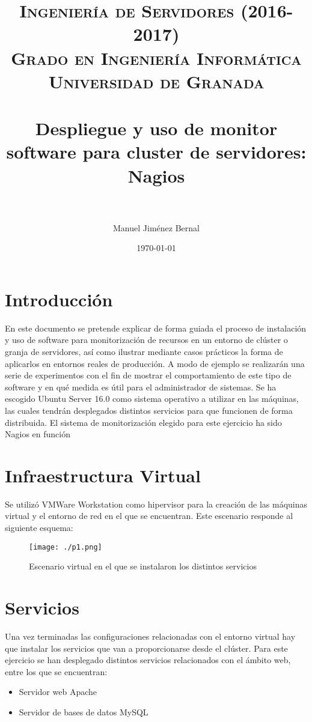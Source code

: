 \documentclass[paper=a4, fontsize=12pt]{scrartcl} %
\title{	
\normalfont \normalsize 
\textsc{{ Ingeniería de Servidores (2016-2017)} \\ Grado en Ingeniería Informática \\ Universidad de Granada} \\ [25pt] %
\horrule{0.5pt} \\[0.4cm] %
\huge Despliegue y uso de monitor software para cluster de servidores: Nagios \\ %
\horrule{2pt} \\[0.5cm] %
}
\author{Manuel Jim\'enez Bernal} %
\date{\normalsize\today} %
\begin{document}
\maketitle %
\newpage
\tableofcontents %

\listoffigures
\newpage


\section{Introducción}
En este documento se pretende explicar de forma guiada el proceso de instalación y uso de software para monitorización de recursos en un entorno de clúster o granja de servidores, así como ilustrar mediante casos prácticos la forma de aplicarlos  en entornos reales de producción. A modo de ejemplo se realizarán una serie de experimentos con el fin de mostrar el comportamiento de este tipo de software y en qué medida es útil para el administrador de sistemas. Se ha escogido Ubuntu Server 16.0 como sistema operativo a utilizar en las máquinas, las cuales tendrán desplegados distintos servicios para que funcionen de forma distribuida.
El sistema de monitorización elegido para este ejercicio ha sido Nagios en función 

\section{Infraestructura Virtual}

Se utilizó VMWare Workstation como hipervisor para la creación de las máquinas virtual y el entorno de red en el que se encuentran. Este escenario responde al siguiente esquema:

\begin{figure}[H] %
	\centering
	\label{lsblk}
	\texttt{[image: ./p1.png]}
	\caption{Escenario virtual en el que se instalaron los distintos servicios} 
\end{figure}


\section{Servicios}

Una vez terminadas las configuraciones relacionadas con el entorno virtual hay que instalar los servicios que van a proporcionarse desde el clúster. Para este ejercicio se han desplegado distintos servicios relacionados con el ámbito web, entre los que se encuentran:
\begin{itemize}
	\item Servidor web Apache
	\item Servidor de bases de datos MySQL
\end{itemize}
\end{document}
